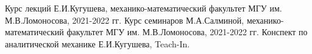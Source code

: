 

\begin{thebibliography}{}
		Курс лекций Е.И.Кугушева, механико-математический факультет МГУ им. М.В.Ломоносова, 2021-2022 гг.
		Курс семинаров М.А.Салминой, механико-математический факультет МГУ им. М.В.Ломоносова, 2021-2022 гг.
		Конспект по аналитической механике Е.И.Кугушева, Teach-In.
\end{thebibliography}

